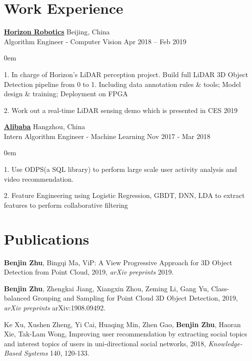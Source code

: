 \documentclass[letterpaper]{article}
\renewenvironment{itemize}{
  \begin{list}{}{
    \setlength{\leftmargin}{1.5em}
  }
}{
  \end{list}
}
\begin{document}
\section*{Work Experience}
\begin{itemize}
	\item \href{https://horizon.ai/}{\textbf{Horizon Robotics}} \hfill Beijing, China
	      \\ Algorithm Engineer - Computer Vision \hfill Apr 2018 -- Feb 2019
	    \vspace{-0.1cm}
		\begin{itemize}
		    \itemsep0em
			\item 1. In charge of Horizon's LiDAR perception project. Build full LiDAR 3D Object Detection pipeline from 0 to 1. Including data annotation rules \& tools; Model design \& training; Deployment on FPGA
			\item 2. Work out a real-time LiDAR sensing demo which is presented in CES 2019
		\end{itemize}          
	\item \href{https://www.alibabagroup.com/}{\textbf{Alibaba}} \hfill Hangzhou, China
	      \\ Intern Algorithm Engineer - Machine Learning \hfill Nov 2017 - Mar 2018
	    \vspace{-0.1cm}
		\begin{itemize}
		    \itemsep0em
			\item 1. Use ODPS(a SQL library) to perform large scale user activity analysis and video recommendation.
			\item 2. Feature Engineering using Logistic Regression, GBDT, DNN, LDA to extract features to perform collaborative filtering
		\end{itemize} 
	\item 
\end{itemize}

\vspace{-1cm}


\section*{Publications}
\begin{itemize}
\item \textbf{Benjin Zhu}, Bingqi Ma, ViP: A View Progressive Approach for 3D Object Detection from Point Cloud, 2019, {\it arXiv preprints} 2019.
\item \textbf{Benjin Zhu}, Zhengkai Jiang, Xiangxin Zhou, Zeming Li, Gang Yu, Class-balanced Grouping and Sampling for Point Cloud 3D Object Detection, 2019, {\it arXiv preprints} arXiv:1908.09492.
\item Ke Xu, Xushen Zheng, Yi Cai, Huaqing Min, Zhen Gao, \textbf{Benjin Zhu}, Haoran Xie, Tak-Lam Wong, Improving user recommendation by extracting social topics and interest topics of users in uni-directional social networks, 2018, {\it Knowledge-Based Systems} 140, 120-133.
\end{itemize}
\end{document}
